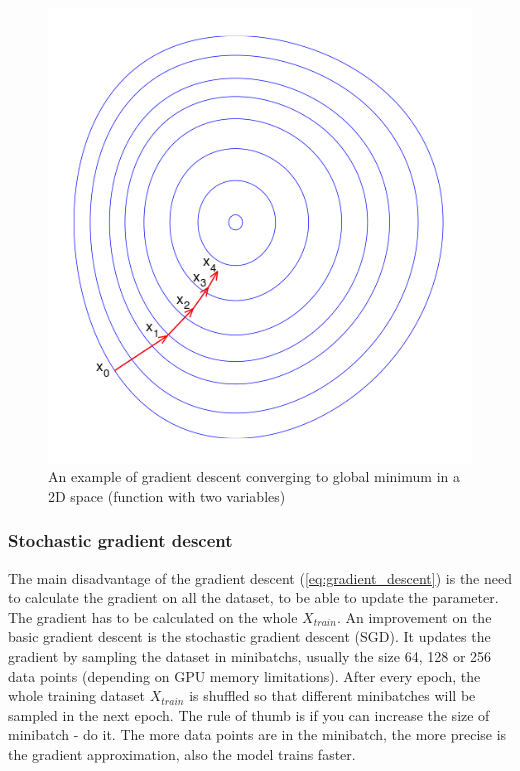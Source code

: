 \documentclass[times, utf8, diplomski]{fer}
\begin{document}
\begin{figure}
  \includegraphics[scale=0.5]{figures/gradient_descent.png}
  \centering
  \caption{An example of gradient descent converging to global minimum in a 2D space (function with two variables)}
  \label{fig:local_and_global_function_values}
\end{figure}

\subsubsection{Stochastic gradient descent}
\label{se:stochastic_gd}

The main disadvantage of the gradient descent (\ref{eq:gradient_descent}) is the need to calculate the gradient on all the dataset, to be able to update the parameter. The gradient has to be calculated on the whole $X_{train}$. An improvement on the basic gradient descent is the stochastic gradient descent (SGD). It updates the gradient by sampling the dataset in minibatchs, usually the size 64, 128 or 256 data points (depending on GPU memory limitations). After every epoch, the whole training dataset $X_{train}$ is shuffled so that different minibatches will be sampled in the next epoch. The rule of thumb is if you can increase the size of minibatch - do it. The more data points are in the minibatch, the more precise is the gradient approximation, also the model trains faster.
\end{document}
